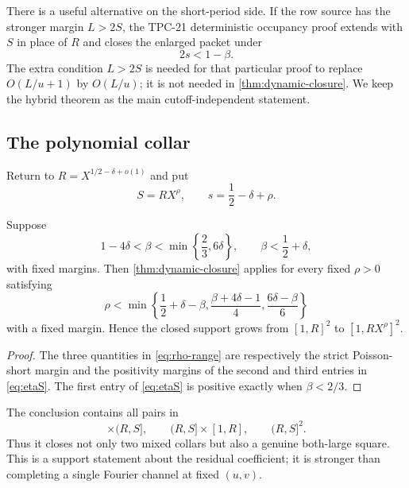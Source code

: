 There is a useful alternative on the short-period side.  If the row
source has the stronger margin \(L>2S\), the TPC-21 deterministic
occupancy proof extends with \(S\) in place of \(R\) and closes the
enlarged packet under
\begin{equation}
 2s<1-\beta.
 \label{eq:dynamic-occupancy}
\end{equation}
The extra condition \(L>2S\) is needed for that particular proof to
replace \(O(L/u+1)\) by \(O(L/u)\); it is not needed in
\cref{thm:dynamic-closure}.  We keep the hybrid theorem as the main
cutoff-independent statement.

\subsection{The polynomial collar}

Return to \(R=X^{1/2-\delta+o(1)}\) and put
\begin{equation}
 S=RX^\rho,
 \qquad s=\frac12-\delta+\rho.
 \label{eq:S-collar}
\end{equation}

\begin{corollary}
\label{cor:closed-strip}
Suppose
\begin{equation}
 1-4\delta<\beta<\min\left\{\frac23,6\delta\right\},
 \qquad \beta<\frac12+\delta,
 \label{eq:old-hybrid-interior}
\end{equation}
with fixed margins.  Then \cref{thm:dynamic-closure} applies for every
fixed \(\rho>0\) satisfying
\begin{equation}
 \boxed{
 \rho<\min\left\{
 \frac12+\delta-\beta,
 \frac{\beta+4\delta-1}{4},
 \frac{6\delta-\beta}{6}
 \right\}}
 \label{eq:rho-range}
\end{equation}
with a fixed margin.  Hence the closed support grows from
\([1,R]^2\) to \([1,RX^\rho]^2\).
\end{corollary}

\begin{proof}
The three quantities in \eqref{eq:rho-range} are respectively the
strict Poisson-short margin and the positivity margins of the second
and third entries in \eqref{eq:etaS}.  The first entry of
\eqref{eq:etaS} is positive exactly when \(\beta<2/3\).
\end{proof}

The conclusion contains all pairs in
\begin{equation}
 [1,R]\times(R,S],\qquad (R,S]\times[1,R],
 \qquad (R,S]^2.
 \label{eq:new-support-pieces}
\end{equation}
Thus it closes not only two mixed collars but also a genuine both-large
square.  This is a support statement about the residual coefficient;
it is stronger than completing a single Fourier channel at fixed
\((u,v)\).

